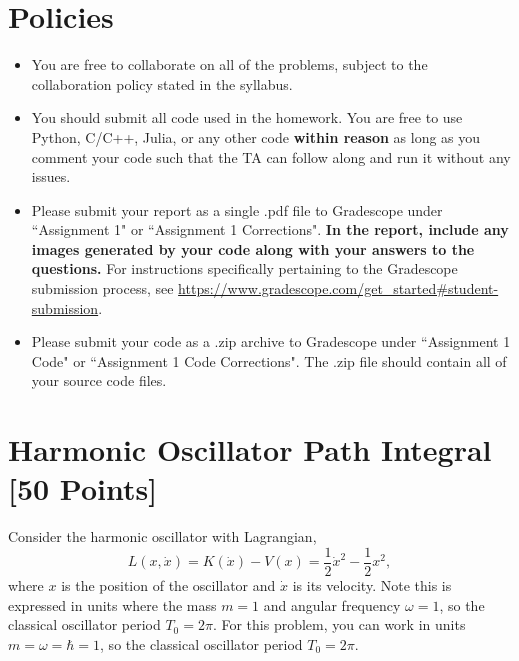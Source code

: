 \newif\ifshowsolutions
\showsolutionsfalse




\pagestyle{fancy}

\section*{Policies}
\begin{itemize}
  \item You are free to collaborate on all of the problems, subject to the collaboration policy stated in the syllabus.
  \item You should submit all code used in the homework.
        You are free to use Python, C/C++, Julia, or any other code \textbf{within reason} as long as you comment your code such that the TA can follow along and run it without any issues.
  \item Please submit your report as a single .pdf file to Gradescope under ``Assignment 1" or ``Assignment 1 Corrections".
        \textbf{In the report, include any images generated by your code along with your answers to the questions.}
        For instructions specifically pertaining to the Gradescope submission process, see \url{https://www.gradescope.com/get_started#student-submission}.
  \item Please submit your code as a .zip archive to Gradescope under ``Assignment 1 Code" or ``Assignment 1 Code Corrections".
        The .zip file should contain all of your source code files.
\end{itemize}

\newpage
\section{Harmonic Oscillator Path Integral [50 Points]}

Consider the harmonic oscillator with Lagrangian,
\begin{equation}
  L(x, \dot{x}) = K(\dot{x}) - V(x) = \frac{1}{2}\dot{x}^2 - \frac{1}{2}x^2,
\end{equation}
where $x$ is the position of the oscillator and $\dot{x}$ is its velocity.
Note this is expressed in units where the mass $m=1$ and angular frequency $\omega=1$, so the classical oscillator period $T_0 = 2\pi$.
For this problem, you can work in units $m = \omega = \hbar = 1$, so the classical oscillator period $T_0 = 2\pi$.

